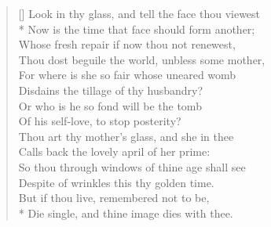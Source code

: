 \documentclass[MAIN]{subfiles}
\begin{document}
\settowidth{\versewidth}{Look in thy glass and tell the face thou viewest}
\begin{verse}[\versewidth]
Look in thy glass, and tell the face thou viewest\\* 
\vin Now is the time that face should form another;\\
Whose fresh repair if now thou not renewest,\\
\vin Thou dost beguile the world, unbless some mother,\\
For where is she so fair whose uneared womb\\ 
\vin Disdains the tillage of thy husbandry?\\
Or who is he so fond will be the tomb\\
\vin Of his self-love, to stop posterity?\\
Thou art thy mother's glass, and she in thee\\
\vin Calls back the lovely april of her prime:\\
So thou through windows of thine age shall see\\
\vin Despite of wrinkles this thy golden time.\\
But if thou live, remembered not to be,\\*
Die single, and thine image dies with thee.
\end{verse}
\end{document}
